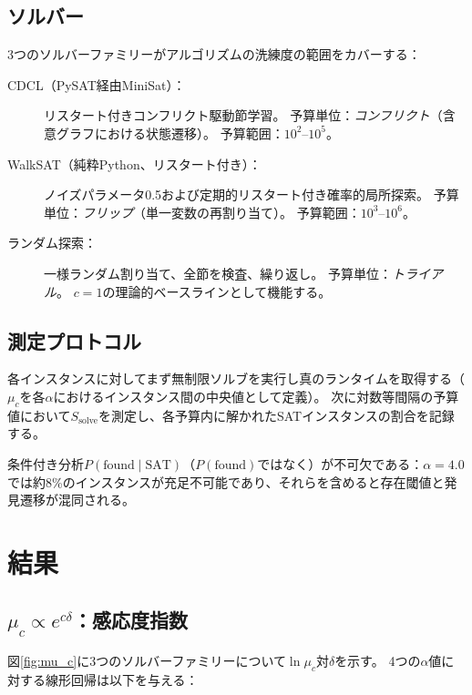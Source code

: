 \documentclass[11pt,a4paper]{article}
\newcommand{\mc}{\mu_c}
\newcommand{\Ssolve}{S_{\text{solve}}}
\newcommand{\Pfound}{P(\text{found})}
\newcommand{\PfSAT}{P(\text{found}\mid\text{SAT})}
\begin{document}
\subsection{ソルバー}

3つのソルバーファミリーがアルゴリズムの洗練度の範囲をカバーする：

\begin{description}
\item[CDCL（PySAT経由MiniSat）：]
  リスタート付きコンフリクト駆動節学習\cite{MarquesSilva1999}。
  予算単位：\emph{コンフリクト}（含意グラフにおける状態遷移）。
  予算範囲：$10^2$--$10^5$。

\item[WalkSAT（純粋Python、リスタート付き）：]
  ノイズパラメータ0.5および定期的リスタート付き確率的局所探索\cite{SKC1994}。
  予算単位：\emph{フリップ}（単一変数の再割り当て）。
  予算範囲：$10^3$--$10^6$。

\item[ランダム探索：]
  一様ランダム割り当て、全節を検査、繰り返し。
  予算単位：\emph{トライアル}。
  $c = 1$の理論的ベースラインとして機能する。
\end{description}

\subsection{測定プロトコル}

各インスタンスに対してまず無制限ソルブを実行し真のランタイムを取得する（$\mc$を各$\alpha$におけるインスタンス間の中央値として定義）。
次に対数等間隔の予算値において$\Ssolve$を測定し、各予算内に解かれたSATインスタンスの割合を記録する。

条件付き分析$\PfSAT$（$\Pfound$ではなく）が不可欠である：$\alpha = 4.0$では約8\%のインスタンスが充足不可能であり、それらを含めると存在閾値と発見遷移が混同される。


\section{結果}
\label{sec:results}

\subsection{$\mc \propto e^{c\delta}$：感応度指数}
\label{sec:mu_c}

図\ref{fig:mu_c}に3つのソルバーファミリーについて$\ln \mc$対$\delta$を示す。
4つの$\alpha$値に対する線形回帰は以下を与える：
\end{document}
